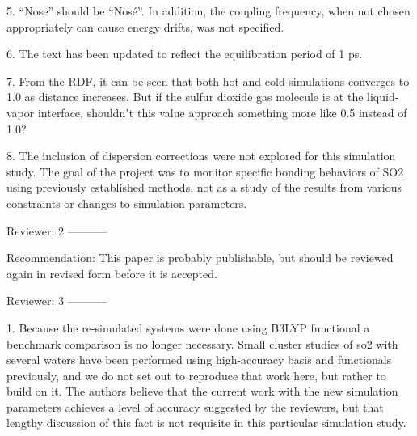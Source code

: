 5. “Nose” should be “Nosé”. In addition, the coupling frequency, when not chosen appropriately can cause energy drifts, was not specified. 

6. The text has been updated to reflect the equilibration period of 1 ps.

7. From the RDF, it can be seen that both hot and cold simulations converges to 1.0 as distance increases. But if the sulfur dioxide gas molecule is at the liquid-vapor interface, shouldnʼt this value approach something more like 0.5 instead of 1.0? 

8. The inclusion of dispersion corrections were not explored for this simulation study. The goal of the project was to monitor specific bonding behaviors of SO2 using previously established methods, not as a study of the results from various constraints or changes to simulation parameters.


Reviewer: 2 
-----------

Recommendation: This paper is probably publishable, but should be reviewed again in revised form before it is accepted. 

Reviewer: 3
-----------

1. Because the re-simulated systems were done using B3LYP functional a benchmark comparison is no longer necessary. Small cluster studies of so2 with several waters have been performed using high-accuracy basis and functionals previously, and we do not set out to reproduce that work here, but rather to build on it. The authors believe that the current work with the new simulation parameters achieves a level of accuracy suggested by the reviewers, but that lengthy discussion of this fact is not requisite in this particular simulation study.

